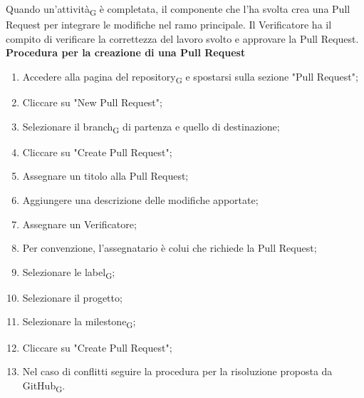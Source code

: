 Quando un'{attività\textsubscript{G}} è completata, il componente che l'ha svolta crea una Pull Request per integrare le modifiche
nel ramo principale. Il Verificatore ha il compito di verificare la correttezza del lavoro svolto e approvare la Pull Request.
\textbf{Procedura per la creazione di una Pull Request} \label{pull_request}
\begin{enumerate}
    \item Accedere alla pagina del {repository\textsubscript{G}} e spostarsi sulla sezione "Pull Request";
    \item Cliccare su "New Pull Request";
    \item Selezionare il {branch\textsubscript{G}} di partenza e quello di destinazione;
    \item Cliccare su "Create Pull Request";
    \item Assegnare un titolo alla Pull Request;
    \item Aggiungere una descrizione delle modifiche apportate;
    \item Assegnare un Verificatore;
    \item Per convenzione, l'assegnatario è colui che richiede la Pull Request;
    \item Selezionare le {label\textsubscript{G}};
    \item Selezionare il progetto;
    \item Selezionare la {milestone\textsubscript{G}};
    \item Cliccare su "Create Pull Request";
    \item Nel caso di conflitti seguire la procedura per la risoluzione proposta da {GitHub\textsubscript{G}}.
\end{enumerate}

